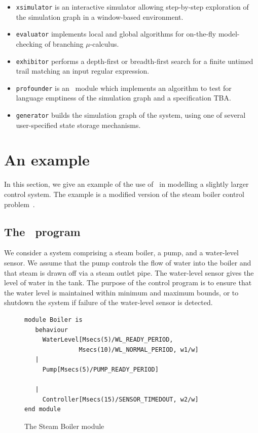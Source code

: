\begin{itemize}
\item {\tt xsimulator} is an interactive simulator allowing step-by-step
  exploration of the simulation graph in a window-based environment.
\item {\tt evaluator} implements local and global algorithms for 
  on-the-fly model-checking of branching $\mu$-calculus.
\item {\tt exhibitor} performs a depth-first or breadth-first
  search  for a finite untimed trail matching an input regular expression. 
\item {\tt profounder} is an \openkronos\ module which implements
  an algorithm to test for language emptiness of the simulation graph
  and a specification TBA.
\item {\tt generator} builds the simulation graph of the system, using
  one of several user-specified state storage mechanisms.
\end{itemize}  


\section{An example\label{sec:prcanexample}}
In this section, we give an example of the use of \candle\ in
modelling a slightly larger control system. The example is a
modified version of the steam boiler control
problem~\cite{abl:96}. 

\subsection{The \candle\ program}
We consider a system comprising a steam boiler,
a pump, and a water-level sensor. We assume that the pump controls the
flow of water into the boiler and that steam is drawn off via a steam
outlet pipe. The water-level sensor gives the level of water in the
tank. The purpose of the control program is to ensure that the water
level is maintained within minimum and maximum bounds, or to shutdown
the system if failure of the water-level sensor is detected.
\begin{figure} 
\begin{center} 
\begin{minipage}{.5\linewidth}
\scriptsize 

\begin{verbatim} 
module Boiler is
   behaviour
     WaterLevel[Msecs(5)/WL_READY_PERIOD,
               Msecs(10)/WL_NORMAL_PERIOD, w1/w]
   | 
     Pump[Msecs(5)/PUMP_READY_PERIOD]
 
   | 
     Controller[Msecs(15)/SENSOR_TIMEDOUT, w2/w]
end module
\end{verbatim}
\end{minipage}
\end{center}
\caption{The Steam Boiler module\label{fig:prsteamboiler}}
\end{figure}

